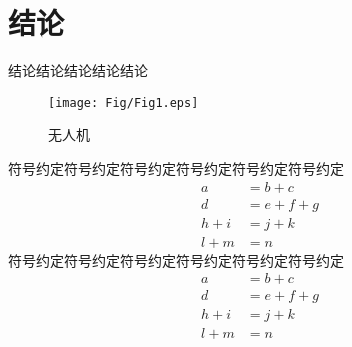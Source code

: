 \section{结论}
结论结论结论结论结论
\begin{figure}[!h]
	\centering
	\texttt{[image: Fig/Fig1.eps]}
	\caption{无人机}
	\label{fig:1}     
\end{figure}
符号约定符号约定符号约定符号约定符号约定符号约定
\begin{equation}
	\begin{aligned}
		a &= b + c \\
		d &= e + f + g \\
		h + i &= j + k \\
		l + m &= n
	\end{aligned}
\end{equation}
符号约定符号约定符号约定符号约定符号约定符号约定
\begin{equation}
	\begin{aligned}
		a &= b + c \\
		d &= e + f + g \\
		h + i &= j + k \\
		l + m &= n
	\end{aligned}
\end{equation}
